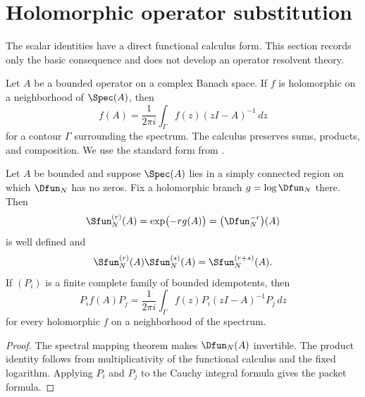 \section{Holomorphic operator substitution}\label{sec:operator_substitution}

The scalar identities have a direct functional calculus form.  This section records only the basic consequence and does not develop an operator resolvent theory.

\begin{standardfact}\label{sf:holomorphic_calculus}
Let $A$ be a bounded operator on a complex Banach space.  If $f$ is holomorphic on a neighborhood of $\Spec(A)$, then
\[
f(A)
=
\frac1{2\pi i}\int_\Gamma f(z)(zI-A)^{-1}\,dz
\]
for a contour $\Gamma$ surrounding the spectrum.  The calculus preserves sums, products, and composition.  We use the standard form from \cite{DunfordSchwartz1958}.
\end{standardfact}

\begin{proposition}\label{prop:operator_reciprocal}
Let $A$ be bounded and suppose $\Spec(A)$ lies in a simply connected region on which $\Dfun_N$ has no zeros.  Fix a holomorphic branch $g=\log\Dfun_N$ there.  Then
\[
\Sfun_N^{(r)}(A)
=
\exp\bigl(-r g(A)\bigr)
=
\bigl(\Dfun_N^{-r}\bigr)(A)
\]
is well defined and
\[
\Sfun_N^{(r)}(A)\Sfun_N^{(s)}(A)
=
\Sfun_N^{(r+s)}(A).
\]
If $(P_i)$ is a finite complete family of bounded idempotents, then
\[
P_i f(A)P_j
=
\frac1{2\pi i}
\int_\Gamma
f(z)P_i(zI-A)^{-1}P_j\,dz
\]
for every holomorphic $f$ on a neighborhood of the spectrum.
\end{proposition}

\begin{proof}
The spectral mapping theorem makes $\Dfun_N(A)$ invertible.  The product identity follows from multiplicativity of the functional calculus and the fixed logarithm.  Applying $P_i$ and $P_j$ to the Cauchy integral formula gives the packet formula.
\end{proof}

